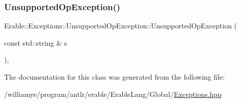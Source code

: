\subsubsection{\texorpdfstring{UnsupportedOpException()}{UnsupportedOpException()}}
{\footnotesize\ttfamily Erable\+::\+Exceptions\+::\+Unsupported\+Op\+Exception\+::\+Unsupported\+Op\+Exception (\begin{DoxyParamCaption}\item[{const std\+::string \&}]{s }\end{DoxyParamCaption})\hspace{0.3cm}{\ttfamily [inline]}, {\ttfamily [explicit]}}



The documentation for this class was generated from the following file\+:\begin{DoxyCompactItemize}
\item 
/williamye/program/antlr/erable/\+Erable\+Lang/\+Global/\mbox{\hyperlink{_exceptions_8hpp}{Exceptions.\+hpp}}\end{DoxyCompactItemize}
